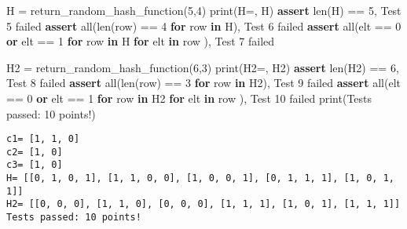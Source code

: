 \documentclass[
]{article}
\newenvironment{Shaded}{}{}
\newcommand{\BuiltInTok}[1]{\textcolor[rgb]{0.00,0.50,0.00}{#1}}
\newcommand{\ControlFlowTok}[1]{\textcolor[rgb]{0.00,0.44,0.13}{\textbf{#1}}}
\newcommand{\DecValTok}[1]{\textcolor[rgb]{0.25,0.63,0.44}{#1}}
\newcommand{\KeywordTok}[1]{\textcolor[rgb]{0.00,0.44,0.13}{\textbf{#1}}}
\newcommand{\NormalTok}[1]{#1}
\newcommand{\OperatorTok}[1]{\textcolor[rgb]{0.40,0.40,0.40}{#1}}
\newcommand{\StringTok}[1]{\textcolor[rgb]{0.25,0.44,0.63}{#1}}
\begin{document}
\begin{Shaded}
\begin{Highlighting}[]
\NormalTok{H }\OperatorTok{=}\NormalTok{ return\_random\_hash\_function(}\DecValTok{5}\NormalTok{,}\DecValTok{4}\NormalTok{)}
\BuiltInTok{print}\NormalTok{(}\StringTok{\textquotesingle{}H=\textquotesingle{}}\NormalTok{, H)}
\ControlFlowTok{assert} \BuiltInTok{len}\NormalTok{(H) }\OperatorTok{==} \DecValTok{5}\NormalTok{, }\StringTok{\textquotesingle{}Test 5 failed\textquotesingle{}}
\ControlFlowTok{assert} \BuiltInTok{all}\NormalTok{(}\BuiltInTok{len}\NormalTok{(row) }\OperatorTok{==} \DecValTok{4} \ControlFlowTok{for}\NormalTok{ row }\KeywordTok{in}\NormalTok{ H), }\StringTok{\textquotesingle{}Test 6 failed\textquotesingle{}}
\ControlFlowTok{assert} \BuiltInTok{all}\NormalTok{(elt }\OperatorTok{==} \DecValTok{0} \KeywordTok{or}\NormalTok{ elt }\OperatorTok{==} \DecValTok{1} \ControlFlowTok{for}\NormalTok{ row }\KeywordTok{in}\NormalTok{ H }\ControlFlowTok{for}\NormalTok{ elt }\KeywordTok{in}\NormalTok{ row ),  }\StringTok{\textquotesingle{}Test 7 failed\textquotesingle{}}

\NormalTok{H2 }\OperatorTok{=}\NormalTok{ return\_random\_hash\_function(}\DecValTok{6}\NormalTok{,}\DecValTok{3}\NormalTok{)}
\BuiltInTok{print}\NormalTok{(}\StringTok{\textquotesingle{}H2=\textquotesingle{}}\NormalTok{, H2)}
\ControlFlowTok{assert} \BuiltInTok{len}\NormalTok{(H2) }\OperatorTok{==} \DecValTok{6}\NormalTok{, }\StringTok{\textquotesingle{}Test 8 failed\textquotesingle{}}
\ControlFlowTok{assert} \BuiltInTok{all}\NormalTok{(}\BuiltInTok{len}\NormalTok{(row) }\OperatorTok{==} \DecValTok{3} \ControlFlowTok{for}\NormalTok{ row }\KeywordTok{in}\NormalTok{ H2),  }\StringTok{\textquotesingle{}Test 9 failed\textquotesingle{}}
\ControlFlowTok{assert} \BuiltInTok{all}\NormalTok{(elt }\OperatorTok{==} \DecValTok{0} \KeywordTok{or}\NormalTok{ elt }\OperatorTok{==} \DecValTok{1} \ControlFlowTok{for}\NormalTok{ row }\KeywordTok{in}\NormalTok{ H2 }\ControlFlowTok{for}\NormalTok{ elt }\KeywordTok{in}\NormalTok{ row ), }\StringTok{\textquotesingle{}Test 10 failed\textquotesingle{}}
\BuiltInTok{print}\NormalTok{(}\StringTok{\textquotesingle{}Tests passed: 10 points!\textquotesingle{}}\NormalTok{)}
\end{Highlighting}
\end{Shaded}

\begin{verbatim}
c1= [1, 1, 0]
c2= [1, 0]
c3= [1, 0]
H= [[0, 1, 0, 1], [1, 1, 0, 0], [1, 0, 0, 1], [0, 1, 1, 1], [1, 0, 1, 1]]
H2= [[0, 0, 0], [1, 1, 0], [0, 0, 0], [1, 1, 1], [1, 0, 1], [1, 1, 1]]
Tests passed: 10 points!
\end{verbatim}
\end{document}
